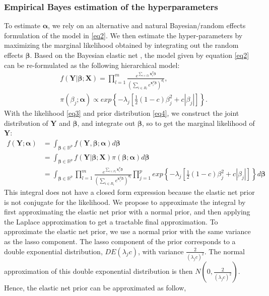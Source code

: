 \subsubsection{Empirical Bayes estimation of the hyperparameters} \label{laplace}
To estimate $\bm{\alpha}$, we rely on an alternative and natural Bayesian/random effects formulation of the model in \eqref{eq2}. We then estimate the hyper-parameters by maximizing the marginal likelihood obtained by integrating out the random effects $\bm{\beta}$. Based on the Bayesian elastic net \citep{li2010bayesian}, the model given by equation \eqref{eq2} can be re-formulated as the following hierarchical model:
\begin{align}
    &f(\bm{Y}|\bm{\beta}; \bm{X}) = \prod_{l=1}^{m} \frac{e^{\sum_{i\in D_l}\bm{x}_i^T\bm{\beta}}}{(\sum_{i\in R_l} e^{\bm{x}_i^T\bm{\beta}})^{d_l}} \label{eq3}, \\
    &\pi(\beta_j; \bm{\alpha}) \propto exp\left\{ -\lambda_j\left[\frac{1}{2}(1-c)\beta_j^2 + c|\beta_j|\right] \right\}. \label{eq4}
\end{align}
With the likelihood \eqref{eq3} and prior distribution \eqref{eq4}, we construct the joint distribution of $\bm{Y}$ and $\bm{\beta}$, and integrate out $\bm{\beta}$, so to get the marginal likelihood of $\bm{Y}$:
\begin{align*}
f(\bm{Y};\bm{\alpha}) &= \int_{\bm{\beta}\in\mathbb{R}^p} f(\bm{Y}, \bm{\beta};\bm{\alpha}) d\bm{\beta} \\
&= \int_{\bm{\beta}\in\mathbb{R}^p} f(\bm{Y}|\bm{\beta};\bm{X}) \pi(\bm{\beta};\bm{\alpha})d\bm{\beta} \\
&= \int_{\bm{\beta}\in\mathbb{R}^p} \prod_{l=1}^{m} \frac{e^{\sum_{i\in D_l}\bm{x}_i^T\bm{\beta}}}{(\sum_{i\in R_l} e^{\bm{x}_i^T\bm{\beta}})^{d_l}} \prod_{j=1}^{p}exp\left\{ -\lambda_j\left[\frac{1}{2}(1-c)\beta_j^2 + c|\beta_j|\right] \right\}  d\bm{\beta}
\end{align*} 
This integral does not have a closed form expression because the elastic net prior is not conjugate for the likelihood. We propose to approximate the integral by first approximating the elastic net prior with a normal prior, and then  applying the Laplace approximation to get a tractable final approximation. To approximate the elastic net prior, we use a normal prior with the same variance as the lasso component. The lasso component of the prior corresponds to a double exponential distribution, $DE(\lambda_jc)$, with variance $\frac{2}{(\lambda_jc)^2}$. The normal approximation of this double exponential distribution is then $N(0, \frac{2}{(\lambda_jc)^2})$. Hence, the elastic net prior can be approximated as follow,
